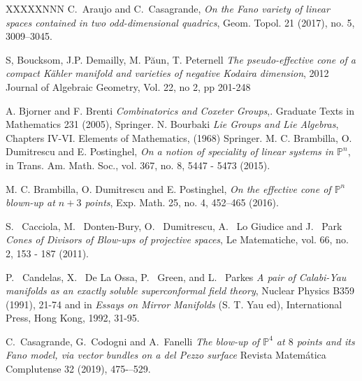\documentclass[12pt]{article}
\numberwithin{equation}{section}
\numberwithin{subeq}{equation}
\begin{document}
\begin{thebibliography}{XXXXXNNN}
C.~Araujo and C.~Casagrande, {\it On the Fano variety of linear spaces contained in two odd-dimensional quadrics},
Geom. Topol. 21 (2017), no. 5, 3009--3045.

 S, Boucksom, J.P. Demailly, M. Păun, T. Peternell 
 {\it The pseudo-effective cone of a compact Kähler manifold and varieties of negative Kodaira dimension}, 2012 Journal of Algebraic Geometry,
 Vol. 22, no 2, pp 201-248 

 A. Bjorner and F. Brenti  {\it Combinatorics and Coxeter Groups},.  Graduate Texts in Mathematics 231 (2005), Springer.
 N. Bourbaki {\it Lie Groups and Lie Algebras}, Chapters IV-VI.  Elements of Mathematics,  (1968) Springer.
 M. C. Brambilla, O. Dumitrescu and E. Postinghel,
{\it On a notion of speciality of linear systems in $\mathbb{P}^n$}, in Trans. Am. Math. Soc.,
vol. 367, no. 8,  5447 - 5473 (2015). 

 M. C. Brambilla, O. Dumitrescu and E. Postinghel,
{\it On the effective cone of $\mathbb{P}^n$ blown-up at $n+3$ points},
 Exp. Math. 25, no. 4, 452--465 (2016).

  S. ~Cacciola, M.~ Donten-Bury, O. ~Dumitrescu, A. ~Lo Giudice and J. ~Park
{\it Cones of Divisors of Blow-ups of projective spaces}, Le Matematiche, vol. 66, no. 2,  153 - 187 (2011).

  P. ~Candelas, X.~ De La Ossa, P. ~Green,  and L. ~Parkes
{\it A pair of Calabi-Yau manifolds as an exactly soluble superconformal field theory}, Nuclear Physics B359 (1991), 21-74 and in {\it Essays on Mirror Manifolds} (S. T. Yau ed), International Press, Hong Kong, 1992, 31-95.


 C.~Casagrande, G.~Codogni and A.~Fanelli 
{\it The blow-up of $\mathbb{P}^4$ at $8$ points and its Fano model, via vector bundles on a del Pezzo surface}
Revista Matemática Complutense 32 (2019), 475-–529.


\end{thebibliography}
\end{document}
